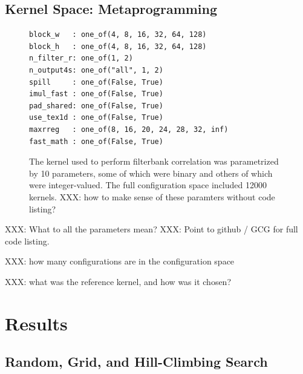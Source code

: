 \documentclass{sig-alternate}
\begin{document}
\subsection{Kernel Space: Metaprogramming}

\begin{figure}
\begin{center}
\begin{minipage}{.43\textwidth}
\begin{verbatim}
block_w   : one_of(4, 8, 16, 32, 64, 128)
block_h   : one_of(4, 8, 16, 32, 64, 128)
n_filter_r: one_of(1, 2)
n_output4s: one_of("all", 1, 2)
spill     : one_of(False, True)
imul_fast : one_of(False, True)
pad_shared: one_of(False, True)
use_tex1d : one_of(False, True)
maxrreg   : one_of(8, 16, 20, 24, 28, 32, inf)
fast_math : one_of(False, True)
\end{verbatim}
\end{minipage}
\end{center}
\caption{The kernel used to perform
filterbank correlation was parametrized by 10 parameters, some of which
were binary and others of which were integer-valued. The full configuration
space included 12000 kernels.
XXX: how to make sense of these paramters without code listing?
}
\end{figure}

XXX: What to all the parameters mean?
XXX: Point to github / GCG for full code listing.

XXX: how many configurations are in the configuration space

XXX: what was the reference kernel, and how was it chosen?

\section{Results}

\subsection{Random, Grid, and Hill-Climbing Search}
\end{document}

